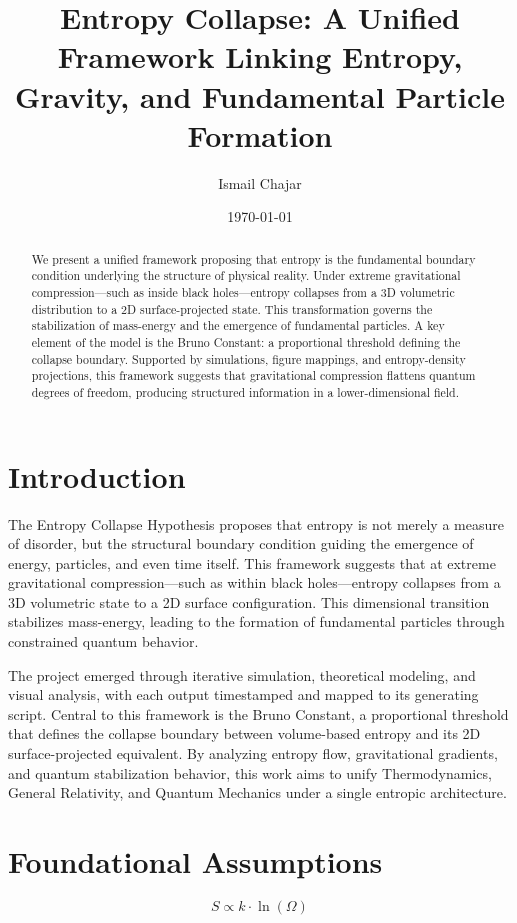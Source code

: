 \documentclass[12pt]{article}
\title{Entropy Collapse: A Unified Framework Linking Entropy, Gravity, and Fundamental Particle Formation}
\author{Ismail Chajar}
\date{\today}
\begin{document}
\maketitle

\begin{abstract}
We present a unified framework proposing that entropy is the fundamental boundary condition underlying the structure of physical reality. Under extreme gravitational compression—such as inside black holes—entropy collapses from a 3D volumetric distribution to a 2D surface-projected state. This transformation governs the stabilization of mass-energy and the emergence of fundamental particles. A key element of the model is the Bruno Constant: a proportional threshold defining the collapse boundary. Supported by simulations, figure mappings, and entropy-density projections, this framework suggests that gravitational compression flattens quantum degrees of freedom, producing structured information in a lower-dimensional field.
\end{abstract}

\clearpage
\tableofcontents
\clearpage

\section{Introduction}
The Entropy Collapse Hypothesis proposes that entropy is not merely a measure of disorder, but the structural boundary condition guiding the emergence of energy, particles, and even time itself. This framework suggests that at extreme gravitational compression—such as within black holes—entropy collapses from a 3D volumetric state to a 2D surface configuration. This dimensional transition stabilizes mass-energy, leading to the formation of fundamental particles through constrained quantum behavior.

The project emerged through iterative simulation, theoretical modeling, and visual analysis, with each output timestamped and mapped to its generating script. Central to this framework is the Bruno Constant, a proportional threshold that defines the collapse boundary between volume-based entropy and its 2D surface-projected equivalent. By analyzing entropy flow, gravitational gradients, and quantum stabilization behavior, this work aims to unify Thermodynamics, General Relativity, and Quantum Mechanics under a single entropic architecture.


\section{Foundational Assumptions}
\[
S \propto k \cdot \ln(\Omega)
\]
\end{document}

